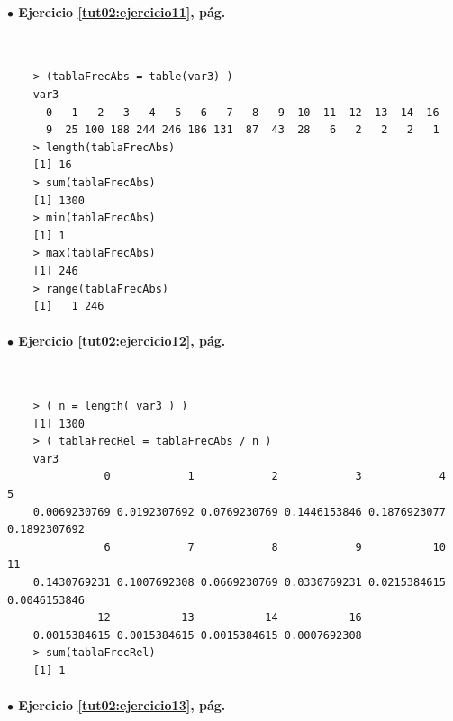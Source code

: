 \documentclass[10pt,a4paper]{article}\usepackage[]{graphicx}\usepackage[]{color}
\begin{document}
\paragraph{\bf $\bullet$ Ejercicio \ref{tut02:ejercicio11},  pág. \pageref{tut02:ejercicio11}}
\label{tut02:ejercicio11:sol}\quad\\
\begin{verbatim}
    > (tablaFrecAbs = table(var3) )
    var3
      0   1   2   3   4   5   6   7   8   9  10  11  12  13  14  16
      9  25 100 188 244 246 186 131  87  43  28   6   2   2   2   1
    > length(tablaFrecAbs)
    [1] 16
    > sum(tablaFrecAbs)
    [1] 1300
    > min(tablaFrecAbs)
    [1] 1
    > max(tablaFrecAbs)
    [1] 246
    > range(tablaFrecAbs)
    [1]   1 246
\end{verbatim}

\paragraph{\bf $\bullet$ Ejercicio \ref{tut02:ejercicio12},  pág. \pageref{tut02:ejercicio12}}
\label{tut02:ejercicio12:sol}\quad\\
\begin{verbatim}
    > ( n = length( var3 ) )
    [1] 1300
    > ( tablaFrecRel = tablaFrecAbs / n )
    var3
               0            1            2            3            4            5
    0.0069230769 0.0192307692 0.0769230769 0.1446153846 0.1876923077 0.1892307692
               6            7            8            9           10           11
    0.1430769231 0.1007692308 0.0669230769 0.0330769231 0.0215384615 0.0046153846
              12           13           14           16
    0.0015384615 0.0015384615 0.0015384615 0.0007692308
    > sum(tablaFrecRel)
    [1] 1
\end{verbatim}

\paragraph{\bf $\bullet$ Ejercicio \ref{tut02:ejercicio13},  pág. \pageref{tut02:ejercicio13}}
\label{tut02:ejercicio13:sol}\quad\\
\end{document}
